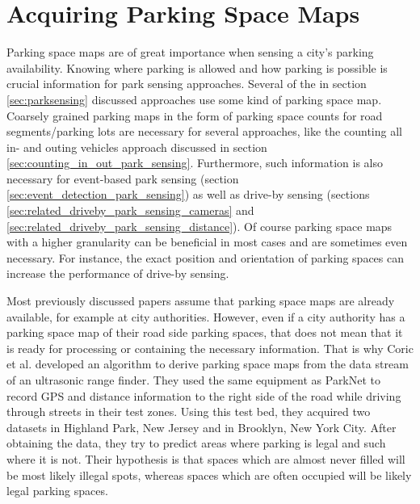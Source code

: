 \section{Acquiring Parking Space Maps}

Parking space maps are of great importance when sensing a city's parking availability. Knowing where parking is allowed and how parking is possible is crucial information for park sensing approaches. Several of the in section \ref{sec:parksensing} discussed approaches use some kind of parking space map. Coarsely grained parking maps in the form of parking space counts for road segments/parking lots are necessary for several approaches, like the counting all in- and outing vehicles approach discussed in section \ref{sec:counting_in_out_park_sensing}. Furthermore, such information is also necessary for event-based park sensing (section \ref{sec:event_detection_park_sensing}) as well as drive-by sensing (sections \ref{sec:related_driveby_park_sensing_cameras} and \ref{sec:related_driveby_park_sensing_distance}). Of course parking space maps with a higher granularity can be beneficial in most cases and are sometimes even necessary. For instance, the exact position and orientation of parking spaces can increase the performance of drive-by sensing.

Most previously discussed papers assume that parking space maps are already available, for example at city authorities. However, even if a city authority has a parking space map of their road side parking spaces, that does not mean that it is ready for processing or containing the necessary information. That is why Coric et al. \cite{Coric2013} developed an algorithm to derive parking space maps from the data stream of an ultrasonic range finder. They used the same equipment as ParkNet \cite{Mathur:2010:PDS:1814433.1814448} to record GPS and distance information to the right side of the road while driving through streets in their test zones. Using this test bed, they acquired two datasets in Highland Park, New Jersey and in Brooklyn, New York City. After obtaining the data, they try to predict areas where parking is legal and such where it is not. Their hypothesis is that spaces which are almost never filled will be most likely illegal spots, whereas spaces which are often occupied will be likely legal parking spaces.

